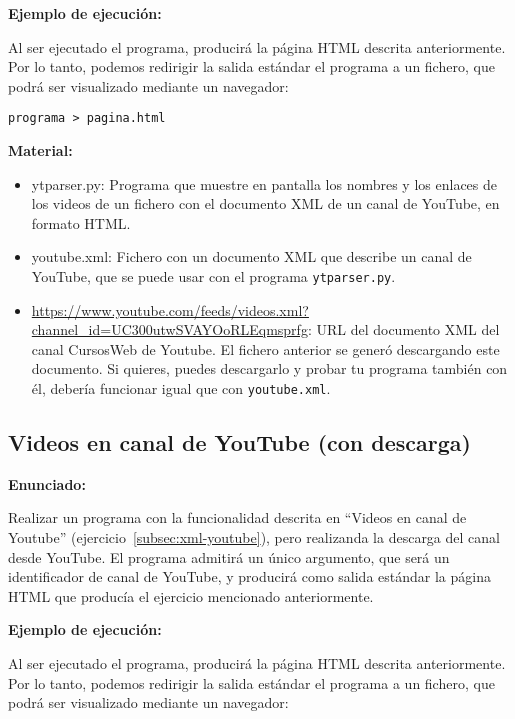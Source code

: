 \textbf{Ejemplo de ejecución:}

Al ser ejecutado el programa, producirá la página HTML descrita anteriormente. Por lo tanto, podemos redirigir la salida estándar el programa a un fichero, que podrá ser visualizado mediante un navegador:

\begin{verbatim}
programa > pagina.html
\end{verbatim}

\textbf{Material:}

\begin{itemize}
\item ytparser.py: Programa que muestre en pantalla los nombres y los enlaces de los videos de un fichero con el documento XML de un canal de YouTube, en formato HTML.
\item youtube.xml: Fichero con un documento XML que describe un canal de YouTube, que se puede usar con el programa \verb|ytparser.py|.
\item \url{https://www.youtube.com/feeds/videos.xml?channel_id=UC300utwSVAYOoRLEqmsprfg}: URL del documento XML del canal CursosWeb de Youtube. El fichero anterior se generó descargando este documento. Si quieres, puedes descargarlo y probar tu programa también con él, debería funcionar igual que con \verb|youtube.xml|.
\end{itemize}

\subsection{Videos en canal de YouTube (con descarga)}
\label{subsec:xml-youtube-descarga}

\textbf{Enunciado:}

Realizar un programa con la funcionalidad descrita en ``Videos en canal de Youtube'' (ejercicio~\ref{subsec:xml-youtube}), pero realizanda la descarga del canal desde YouTube. El programa admitirá un único argumento, que será un identificador de canal de YouTube, y producirá como salida estándar la página HTML que producía el ejercicio mencionado anteriormente.

\textbf{Ejemplo de ejecución:}

Al ser ejecutado el programa, producirá la página HTML descrita anteriormente. Por lo tanto, podemos redirigir la salida estándar el programa a un fichero, que podrá ser visualizado mediante un navegador:

